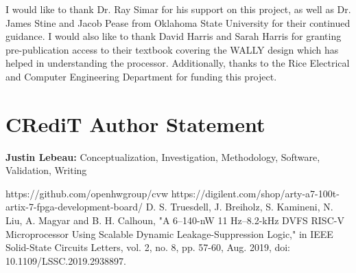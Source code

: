 \documentclass[conference]{IEEEtran}
\begin{document}
I would like to thank Dr. Ray Simar for his support on this project, as well as Dr. James Stine and Jacob Pease from Oklahoma State University for their continued guidance. I would also like to thank David Harris and Sarah Harris for granting pre-publication access to their textbook covering the WALLY design which has helped in understanding the processor. Additionally, thanks to the Rice Electrical and Computer Engineering Department for funding this project.

\section*{CRediT Author Statement}
\textbf{Justin Lebeau:}
Conceptualization, Investigation, Methodology, Software, Validation, Writing

\begin{thebibliography}{00}
 https://github.com/openhwgroup/cvw
 https://digilent.com/shop/arty-a7-100t-artix-7-fpga-development-board/
 D. S. Truesdell, J. Breiholz, S. Kamineni, N. Liu, A. Magyar and B. H. Calhoun, "A 6–140-nW 11 Hz–8.2-kHz DVFS RISC-V Microprocessor Using Scalable Dynamic Leakage-Suppression Logic," in IEEE Solid-State
Circuits Letters, vol. 2, no. 8, pp. 57-60, Aug. 2019, doi: 10.1109/LSSC.2019.2938897.

\end{thebibliography}
\end{document}
